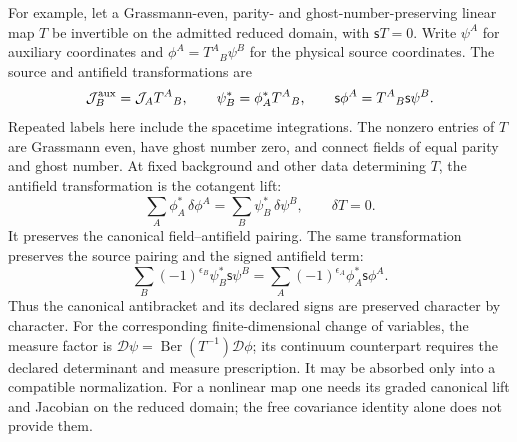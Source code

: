 \documentclass[final,5p,times,twocolumn,numbers,nopreprintline]{elsarticle}
\numberwithin{equation}{section}
\theoremstyle{definition}
\theoremstyle{remark}
\newcommand{\BR}{\mathsf s}
\begin{document}
For example, let a Grassmann-even, parity- and ghost-number-preserving
linear map \(T\) be invertible on the admitted reduced domain,
with \(\BR T=0\). Write \(\psi^A\) for auxiliary coordinates
and \(\phi^A=T^A{}_B\psi^B\) for the physical source coordinates.
The source and antifield transformations are
\[
 \mathcal J^{\rm aux}_B=\mathcal J_A T^A{}_B,\qquad
 \psi_B^*=\phi_A^*T^A{}_B,\qquad
 \BR\phi^A=T^A{}_B\BR\psi^B .
\]
Repeated labels here include the spacetime integrations. The nonzero
entries of \(T\) are Grassmann even, have ghost number zero,
and connect fields of equal parity and ghost number.
At fixed background and other data determining
\(T\), the antifield transformation is the cotangent lift:
\[
 \sum_A\phi_A^*\,\delta\phi^A
  =\sum_B\psi_B^*\,\delta\psi^B,\qquad \delta T=0.
\]
It preserves the canonical field--antifield pairing. The same
transformation preserves the source pairing and the signed
antifield term:
\[
 \sum_B(-1)^{\epsilon_B}\psi_B^*\BR\psi^B
    =\sum_A(-1)^{\epsilon_A}\phi_A^*\BR\phi^A .
\]
Thus the canonical antibracket and its declared signs are
preserved character by character. For the corresponding
finite-dimensional change of variables, the measure factor is
\(\mathcal D\psi=\operatorname{Ber}(T^{-1})\mathcal D\phi\);
its continuum counterpart requires the declared determinant and
measure prescription. It may be absorbed only into a compatible
normalization.
For a nonlinear map one needs its graded canonical lift and
Jacobian on the reduced domain; the free covariance identity alone
does not provide them.
\end{document}
